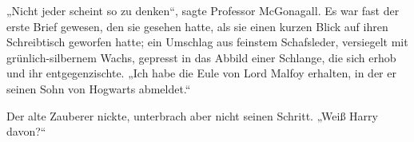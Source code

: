 „Nicht jeder scheint so zu denken“, sagte Professor McGonagall.
Es war fast der erste Brief gewesen, den sie gesehen hatte, als sie einen kurzen Blick auf ihren Schreibtisch geworfen hatte; ein Umschlag aus feinstem Schafsleder, versiegelt mit grünlich-silbernem Wachs, gepresst in das Abbild einer Schlange, die sich erhob und ihr entgegenzischte.
„Ich habe die Eule von Lord Malfoy erhalten, in der er seinen Sohn von Hogwarts abmeldet.“

Der alte Zauberer nickte, unterbrach aber nicht seinen Schritt.
„Weiß Harry davon?“

